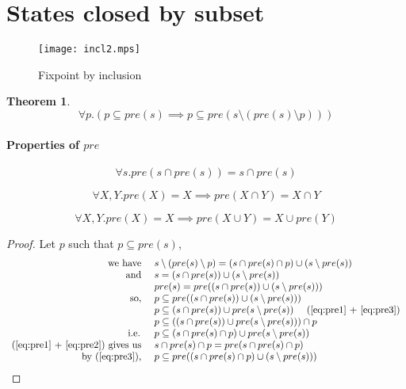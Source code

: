 \documentclass{article}
\newtheorem{thm}{Theorem}
\begin{document}
\section{States closed by subset}

\begin{figure}[h]\centering
  \texttt{[image: incl2.mps]}
  \caption{Fixpoint by inclusion}
\label{fig:incl}
\end{figure}

\begin{thm}
  \label{thm1}
  \begin{equation*}
    \label{eq:1}
    \forall p . (p \subseteq pre(s) \implies 
    p \subseteq pre(s \setminus (pre(s) \setminus p)))
  \end{equation*}
\end{thm}

\paragraph{Properties of $pre$}

\begin{equation}
  \label{eq:pre1}
  \forall s . pre(s \cap pre(s)) = s \cap pre(s)
\end{equation}

\begin{equation}
  \label{eq:pre2}
  \forall X,Y . pre(X) = X \implies pre(X \cap Y) = X \cap Y
\end{equation}

\begin{equation}
  \label{eq:pre3}
  \forall X,Y . pre(X) = X \implies pre(X \cup Y) = X \cup pre(Y)
\end{equation}


\begin{proof}
Let $p$ such that $p \subseteq pre(s)$,
\[
\begin{array}{rl}
  \mbox{we have } & s \setminus (pre(s) \setminus p) = 
  (s \cap pre(s) \cap p) \cup (s \setminus pre(s))\\
  \mbox{and } &s = (s \cap pre(s)) \cup (s \setminus pre(s))\\
  &pre(s) = pre((s \cap pre(s)) \cup (s \setminus pre(s)))\\
  \mbox{so, }& p \subseteq pre((s \cap pre(s)) \cup (s \setminus
  pre(s))) \\
  &p \subseteq (s \cap pre(s)) \cup pre(s \setminus pre(s))
  ~~~~\mbox{(\ref{eq:pre1} + \ref{eq:pre3})}\\
  &p \subseteq ((s \cap pre(s)) \cup pre(s \setminus pre(s))) \cap p\\
  \mbox{i.e. }&p \subseteq (s \cap pre(s) \cap p) \cup
  pre(s \setminus pre(s))\\
  \mbox{(\ref{eq:pre1} + \ref{eq:pre2}) gives us }& s \cap pre(s) \cap
  p = pre(s \cap pre(s) \cap p)\\
  \mbox{by (\ref{eq:pre3}), }& p \subseteq pre((s \cap pre(s) \cap p) \cup
  (s \setminus pre(s)))\\
\end{array}
\]
\end{proof}
\end{document}
